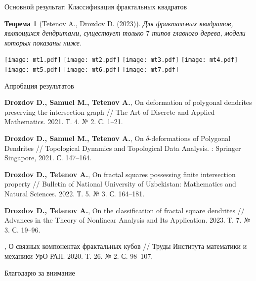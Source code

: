 \documentclass[aspectratio=1610, 10pt, notheorems]{beamer}
\newtheorem{theorem}     {Теорема}
\begin{document}
\begin{frame}{Основной результат: Классификация фрактальных квадратов}

\begin{theorem}[Tetenov A., Drozdov D.  (2023)]
Для фрактальных квадратов, являющихся дендритами, существует только $7$ типов главного дерева, модели которых показаны ниже.
\end{theorem}
\texttt{[image: mt1.pdf]}
\hfill
\texttt{[image: mt2.pdf]}
\hfill
\texttt{[image: mt3.pdf]}
\hfill
\texttt{[image: mt4.pdf]}\\
\texttt{[image: mt5.pdf]}
\hfill
\texttt{[image: mt6.pdf]}
\hfill
\texttt{[image: mt7.pdf]}
\end{frame}


\begin{frame}{Апробация результатов}

{\normalsize
\begin{thebibliography}{9}
{\bf Drozdov D., Samuel M., Tetenov A.},
On deformation of polygonal dendrites preserving the intersection graph //
The Art of Discrete and Applied Mathematics. 2021. Т. 4. № 2. С. 1--21.

{\bf Drozdov D., Samuel M., Tetenov A.}, 
On $\delta$-deformations of Polygonal Dendrites // 
Topological Dynamics and Topological Data Analysis. : Springer Singapore, 2021. С. 147--164.

{\bf Drozdov D., Tetenov A.}, 
On fractal squares possessing finite intersection property // 
Bulletin of National University of Uzbekistan: Mathematics and Natural Sciences. 2022. Т. 5. № 3. С. 164--181.

{\bf Drozdov D., Tetenov A.}, 
On the classification of fractal square dendrites // 
Advances in the Theory of Nonlinear Analysis and Its Application. 2023. Т. 7. № 3. С. 19--96.

,
О связных компонентах фрактальных кубов // 
Труды Института математики и механики УрО РАН. 2020. Т. 26. № 2. С. 98--107.
\end{thebibliography}}
\end{frame}


\begin{frame}{}
\begin{center}
\Huge Благодарю за внимание
\end{center}
\end{frame}
\end{document}
